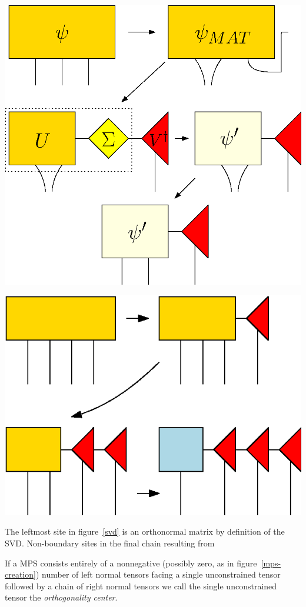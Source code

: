 \documentclass[12pt]{article}
\newenvironment{Figure}
  {\par\medskip\noindent\minipage{\linewidth}}
  {\endminipage\par\medskip}
\begin{document}
\begin{multicols}{2}
	\begin{Figure}
		\center\includegraphics[width=.7\textwidth]{./Figures/svd.eps}
		\label{svd}
	\end{Figure}

	\begin{Figure}
		\center\includegraphics[width=.7\textwidth]{./Figures/mps-creation.eps}
		\label{mps-creation}
	\end{Figure}

	The leftmost site
	in figure~\ref{svd} is an orthonormal matrix by definition of the
	SVD. Non-boundary sites in the final chain resulting from

	If a MPS consists entirely of a nonnegative (possibly zero, as in
	figure~\ref{mps-creation}) number of left normal tensors facing a
	single unconstrained tensor followed by a chain of right normal
	tensors we call the single unconstrained tensor the
	\textit{orthogonality center}.



\end{multicols}
\end{document}
